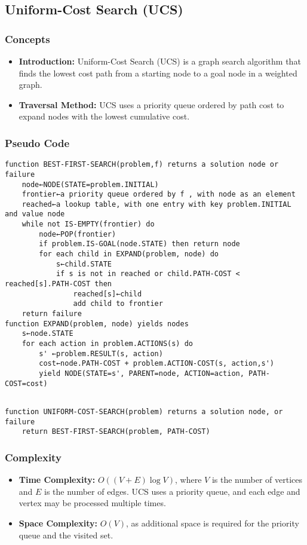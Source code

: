 \subsection{Uniform-Cost Search (UCS)}
\subsubsection*{Concepts}
\begin{itemize}
    \item \textbf{Introduction:} Uniform-Cost Search (UCS) is a graph search algorithm that finds the lowest cost path from a starting node to a goal node in a weighted graph.
    \item \textbf{Traversal Method:} UCS uses a priority queue ordered by path cost to expand nodes with the lowest cumulative cost.
\end{itemize}

\subsubsection*{Pseudo Code}
\label{UCS_best_first_search}
\begin{verbatim}
function BEST-FIRST-SEARCH(problem,f) returns a solution node or failure
    node←NODE(STATE=problem.INITIAL)
    frontier←a priority queue ordered by f , with node as an element
    reached←a lookup table, with one entry with key problem.INITIAL and value node
    while not IS-EMPTY(frontier) do
        node←POP(frontier)
        if problem.IS-GOAL(node.STATE) then return node
        for each child in EXPAND(problem, node) do
            s←child.STATE
            if s is not in reached or child.PATH-COST < reached[s].PATH-COST then
                reached[s]←child
                add child to frontier
    return failure
function EXPAND(problem, node) yields nodes
    s←node.STATE
    for each action in problem.ACTIONS(s) do
        s' ←problem.RESULT(s, action)
        cost←node.PATH-COST + problem.ACTION-COST(s, action,s')
        yield NODE(STATE=s', PARENT=node, ACTION=action, PATH-COST=cost)
\end{verbatim}
\begin{verbatim}

function UNIFORM-COST-SEARCH(problem) returns a solution node, or failure
    return BEST-FIRST-SEARCH(problem, PATH-COST)    
\end{verbatim}

\subsubsection*{Complexity}
\begin{itemize}
    \item \textbf{Time Complexity:} \(O((V + E) \log V)\), where \(V\) is the number of vertices and \(E\) is the number of edges. UCS uses a priority queue, and each edge and vertex may be processed multiple times.
    \item \textbf{Space Complexity:} \(O(V)\), as additional space is required for the priority queue and the visited set.
\end{itemize}

